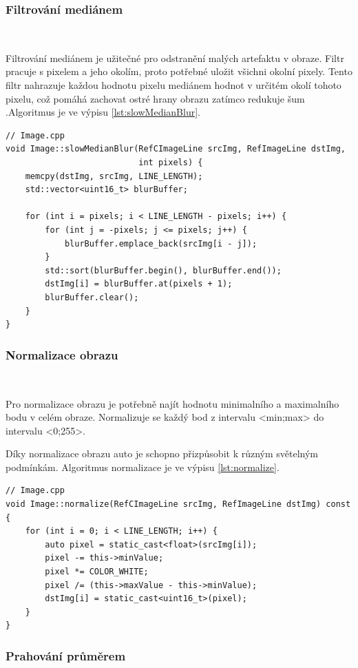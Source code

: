 \subsubsection{Filtrování mediánem}\

Filtrování mediánem je užitečné pro odstranění malých artefaktu v obraze.
Filtr pracuje s pixelem a jeho okolím, proto potřebné uložit všichni okolní
pixely. Tento filtr nahrazuje každou hodnotu pixelu mediánem hodnot v určitém 
okolí tohoto pixelu, což pomáhá zachovat ostré hrany obrazu zatímco redukuje šum
.Algoritmus je ve výpisu \ref{lst:slowMedianBlur}\cite{draha}\cite{robot}.

\begin{lstlisting}[caption=Filtrování mediánem, label=lst:slowMedianBlur]
// Image.cpp
void Image::slowMedianBlur(RefCImageLine srcImg, RefImageLine dstImg,
                           int pixels) {
    memcpy(dstImg, srcImg, LINE_LENGTH);
    std::vector<uint16_t> blurBuffer;

    for (int i = pixels; i < LINE_LENGTH - pixels; i++) {
        for (int j = -pixels; j <= pixels; j++) {
            blurBuffer.emplace_back(srcImg[i - j]);
        }
        std::sort(blurBuffer.begin(), blurBuffer.end());
        dstImg[i] = blurBuffer.at(pixels + 1);
        blurBuffer.clear();
    }
}
\end{lstlisting}


\subsubsection{Normalizace obrazu}\

Pro normalizace obrazu je potřebně najít hodnotu minimalního a maximalního bodu v
celém obraze. Normalizuje se každý bod z intervalu <min;max>
do intervalu <0;255>.

Díky normalizace obrazu auto je schopno přizpůsobit k různým světelným podmínkám.
Algoritmus normalizace je ve výpisu \ref{lst:normalize}\cite{robot}.
\begin{lstlisting}[caption=Normalizace obrazu, label=lst:normalize]
// Image.cpp
void Image::normalize(RefCImageLine srcImg, RefImageLine dstImg) const {
    for (int i = 0; i < LINE_LENGTH; i++) {
        auto pixel = static_cast<float>(srcImg[i]);
        pixel -= this->minValue;
        pixel *= COLOR_WHITE;
        pixel /= (this->maxValue - this->minValue);
        dstImg[i] = static_cast<uint16_t>(pixel);
    }
}
\end{lstlisting}

\subsubsection{Prahování průměrem}\

